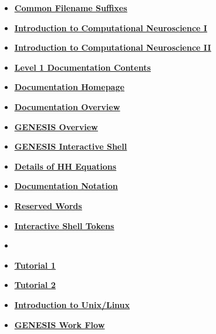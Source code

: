 \documentclass[12pt]{article}
\begin{document}
\begin{itemize}
\item \href{../common-suffixes/common-suffixes.pdf}{\bf \underline{Common Filename Suffixes}}

\item \href{../compneurosci-1/compneurosci-1.pdf}{\bf \underline{Introduction to Computational Neuroscience I}}

\item \href{../compneurosci-2/compneurosci-2.pdf}{\bf \underline{Introduction to Computational Neuroscience II}}

\item \href{../contents-level1/contents-level1.pdf}{\bf \underline{Level 1 Documentation Contents}}

\item \href{../documentation-homepage/documentation-homepage.pdf}{\bf \underline{Documentation Homepage}}

\item \href{../documentation-overview/documentation-overview.pdf}{\bf \underline{Documentation Overview}}

\item \href{../genesis-overview/genesis-overview.pdf}{\bf \underline{GENESIS Overview}}

\item \href{../gshell/gshell.pdf}{\bf \underline{GENESIS Interactive Shell}}

\item \href{../hh-model-details/hh-model-details.pdf}{\bf \underline{Details of HH Equations}}

\item \href{../notation/notation.pdf}{\bf \underline{Documentation Notation}}

\item \href{../reserved-words/reserved-words.pdf}{\bf \underline{Reserved Words}}

\item \href{../shell-tokens/shell-tokens.pdf}{\bf \underline{Interactive Shell Tokens}}

\item \href{../tutorial-jaeger/tutorial-jaeger.pdf}{\bf \underline{}}

\item \href{../tutorial1/tutorial1.pdf}{\bf \underline{Tutorial 1}}

\item \href{../tutorial2/tutorial2.pdf}{\bf \underline{Tutorial 2}}

\item \href{../unix-linux/unix-linux.pdf}{\bf \underline{Introduction to Unix/Linux}}

\item \href{../work-flow/work-flow.pdf}{\bf \underline{GENESIS Work Flow}}


\end{itemize}

\end{document}
